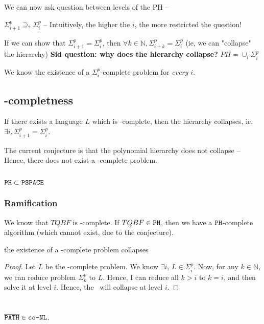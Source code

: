 We can now ask question between levels of the PH --

$\Sigma_{i+1}^p \supseteq_? \Sigma_i^p$ -- Intuitively, the higher the $i$, the
more restricted the question!

If we can show that  $\Sigma_{i+1}^p= \Sigma_i^p$, then $\forall k \in \mathbb{N}, \Sigma_{i+k}^p= \Sigma_i^p$
(ie, we can "collapse" the hierarchy)
\textbf{Sid question: why does the hierarchy collapse?}
$PH = \cup_i \Sigma_i^p$


We know the existence of a $\Sigma_i^p$-complete problem for \textit{every $i$}.

\subsection{\phtime-completness}

If there exists a language $L$ which is \phtime-complete, then the hierarchy collapses,
ie, $\exists i, \Sigma_{i+1}^p = \Sigma_i^p$.

The current conjecture is that the polynomial hierarchy does not collapse -- Hence,
there does not exist a \phtime-complete problem.

\subsection{$\texttt{PH} \subset \texttt{PSPACE}$}

\subsubsection{Ramification}
We know that $TQBF$ is \pspace-complete. If $TQBF \in \texttt{PH}$, then we
have a $\texttt{PH}$-complete algorithm (which cannot exist, due to the conjecture).

\begin{theorem}the existence of a \phtime-complete problem collapses \phtime
\end{theorem}
\begin{proof}
    Let $L$ be the \phtime-complete problem. We know $\exists i$, 
    $L \in \Sigma_i^p$. Now, for any $k \in \mathbb{N}$, we can reduce problem
    $\Sigma_k^p$ to $L$. Hence, I can reduce all $k > i$ to $k = i$, and then
    solve it at level $i$. Hence, the \phtime~will collapse at level $i$.
\end{proof}

\section{\conlogspace}
$\overline{\texttt{PATH}} \in \texttt{co-NL}$.

